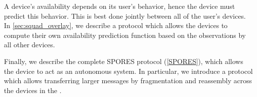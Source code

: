 A device's availability depends on its user's behavior, hence the device must 
predict this behavior.
This is best done jointly between all of the user's devices.
In \cref{sec:squad_overlay}, we describe a protocol which allows the devices to 
compute their own availability prediction function based on the observations by 
all other devices.

Finally, we describe the complete \ac{SPORES} protocol (\cref{SPORES}), which 
allows the device \squad to act as an autonomous system.
In particular, we introduce a protocol which allows transferring larger 
messages by fragmentation and reassembly across the devices in the \squad.




%
